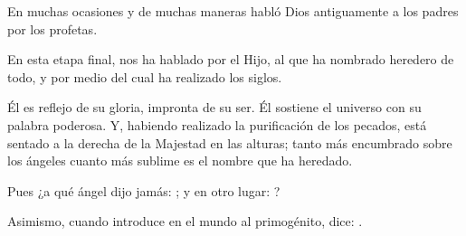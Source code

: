 
 


\begin{scripture}
	En muchas ocasiones y de muchas maneras habló Dios antiguamente a los padres por los profetas.
	
	En esta etapa final, nos ha hablado por el Hijo, al que ha nombrado heredero de todo, y por medio del cual ha realizado los siglos.
	
	Él es reflejo de su gloria, impronta de su ser. Él sostiene el universo con su palabra poderosa. Y, habiendo realizado la purificación de los pecados, está sentado a la derecha de la Majestad en las alturas; tanto más encumbrado sobre los ángeles cuanto más sublime es el nombre que ha heredado.
	
	Pues ¿a qué ángel dijo jamás: ; y en otro lugar: ?

	Asimismo, cuando introduce en el mundo al primogénito, dice: .
\end{scripture}


 


